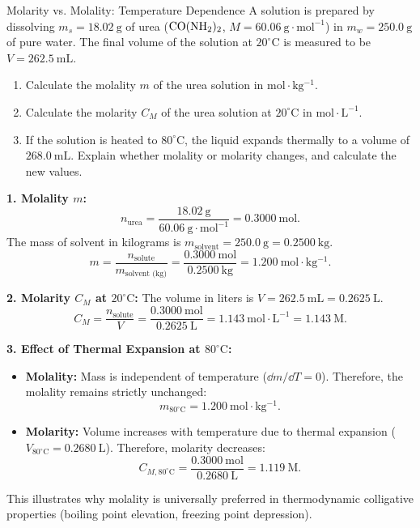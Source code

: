 \begin{exercise}{Molarity vs. Molality: Temperature Dependence}
A solution is prepared by dissolving $m_s = 18.02\ \mathrm{g}$ of urea ($\ce{CO(NH2)2}$, $M = 60.06\ \mathrm{g\cdot mol^{-1}}$) in $m_w = 250.0\ \mathrm{g}$ of pure water. The final volume of the solution at $20^\circ\mathrm{C}$ is measured to be $V = 262.5\ \mathrm{mL}$.
\begin{enumerate}[leftmargin=1.5em,itemsep=2pt]
  \item Calculate the molality $m$ of the urea solution in $\mathrm{mol\cdot kg^{-1}}$.
  \item Calculate the molarity $C_M$ of the urea solution at $20^\circ\mathrm{C}$ in $\mathrm{mol\cdot L^{-1}}$.
  \item If the solution is heated to $80^\circ\mathrm{C}$, the liquid expands thermally to a volume of $268.0\ \mathrm{mL}$. Explain whether molality or molarity changes, and calculate the new values.
\end{enumerate}
\end{exercise}

\begin{tabletworkspace}[5.0cm]
\end{tabletworkspace}

\begin{solution}
\textbf{1. Molality $m$:}
\[
n_{\text{urea}} = \frac{18.02\ \mathrm{g}}{60.06\ \mathrm{g\cdot mol^{-1}}} = 0.3000\ \mathrm{mol}.
\]
The mass of solvent in kilograms is $m_{\text{solvent}} = 250.0\ \mathrm{g} = 0.2500\ \mathrm{kg}$.
\[
m = \frac{n_{\text{solute}}}{m_{\text{solvent (kg)}}} = \frac{0.3000\ \mathrm{mol}}{0.2500\ \mathrm{kg}} = \mathbf{1.200\ \mathrm{mol\cdot kg^{-1}}}.
\]

\textbf{2. Molarity $C_M$ at $20^\circ\mathrm{C}$:}
The volume in liters is $V = 262.5\ \mathrm{mL} = 0.2625\ \mathrm{L}$.
\[
C_M = \frac{n_{\text{solute}}}{V} = \frac{0.3000\ \mathrm{mol}}{0.2625\ \mathrm{L}} = \mathbf{1.143\ \mathrm{mol\cdot L^{-1}} = 1.143\ \mathrm{M}}.
\]

\textbf{3. Effect of Thermal Expansion at $80^\circ\mathrm{C}$:}
\begin{itemize}[leftmargin=1.5em,itemsep=2pt]
  \item \textbf{Molality:} Mass is independent of temperature ($\dd m / \dd T = 0$). Therefore, the molality remains strictly unchanged:
  \[
  m_{80^\circ\mathrm{C}} = \mathbf{1.200\ \mathrm{mol\cdot kg^{-1}}}.
  \]
  \item \textbf{Molarity:} Volume increases with temperature due to thermal expansion ($V_{80^\circ\mathrm{C}} = 0.2680\ \mathrm{L}$). Therefore, molarity decreases:
  \[
  C_{M,80^\circ\mathrm{C}} = \frac{0.3000\ \mathrm{mol}}{0.2680\ \mathrm{L}} = \mathbf{1.119\ \mathrm{M}}.
  \]
\end{itemize}
This illustrates why molality is universally preferred in thermodynamic colligative properties (boiling point elevation, freezing point depression).
\end{solution}

